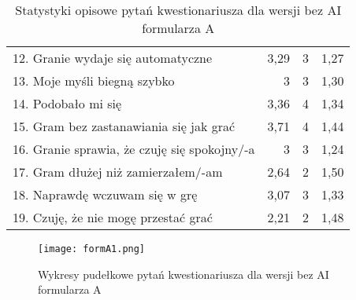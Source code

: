 \begin{table}[h!]
\begin{center}
\begin{tabular}{|m{12em}|r|r|r|}
            12. Granie wydaje się automatyczne                                & 3,29          & 3       & 1,27           \\
            13. Moje myśli \newline biegną szybko                             & 3             & 3       & 1,30           \\
            14. Podobało mi się                                               & 3,36          & 4       & 1,34           \\
            15. Gram bez zastanawiania się jak grać                           & 3,71          & 4       & 1,44           \\
            16. Granie sprawia, \newline że czuję się spokojny/-a             & 3             & 3       & 1,24           \\
            17. Gram dłużej \newline niż zamierzałem/-am                      & 2,64          & 2       & 1,50           \\
            18. Naprawdę wczuwam się w grę                                    & 3,07          & 3       & 1,33           \\
            19. Czuję, że nie mogę przestać grać                              & 2,21          & 2       & 1,48           \\
            \hline
        \end{tabular}
    \end{center}
    \caption{Statystyki opisowe pytań kwestionariusza dla wersji bez AI formularza A}\label{tab1:appendixB_6}
\end{table}

\begin{figure}[h!]
    \centering
    \texttt{[image: formA1.png]}
    \caption{Wykresy pudełkowe pytań kwestionariusza dla wersji bez AI formularza A}
    \label{fig:appendixB_formA1}
\end{figure}


